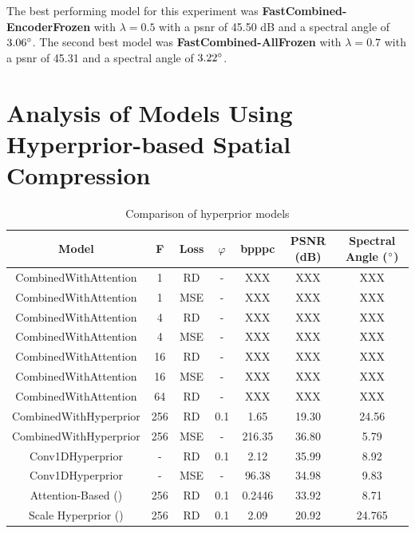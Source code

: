 The best performing model for this experiment was \textbf{FastCombined-EncoderFrozen} with $\lambda=0.5$ with a \ac{psnr} of 45.50 dB and a spectral angle of $3.06 \degree$. The second best model was \textbf{FastCombined-AllFrozen} with $\lambda=0.7$ with a \ac{psnr} of 45.31 and a spectral angle of $3.22 \degree$.

\section{Analysis of Models Using Hyperprior-based Spatial Compression\label{sec:ch5hyperprior}}
\begin{table}
\centering
\begin{tabular}{|c|c|c|c|c|c|c|}
\hline
Model & F & Loss &$\varphi$ & bpppc & PSNR (dB) & Spectral Angle ($\degree$) \\
\hline\hline
CombinedWithAttention & 1 & RD & - & XXX & XXX & XXX \\
\hline
CombinedWithAttention & 1 & MSE & - & XXX & XXX & XXX \\
\hline
CombinedWithAttention & 4 & RD & - & XXX & XXX & XXX \\
\hline
CombinedWithAttention & 4 & MSE & - & XXX & XXX & XXX \\
\hline
CombinedWithAttention & 16 & RD & - & XXX & XXX & XXX \\
\hline
CombinedWithAttention & 16 & MSE & - & XXX & XXX & XXX \\
\hline
CombinedWithAttention & 64 & RD & - & XXX & XXX & XXX \\
\hline
CombinedWithHyperprior & 256 & RD & 0.1 & 1.65 & 19.30 & 24.56 \\
\hline
CombinedWithHyperprior & 256 & MSE & - & 216.35 & 36.80 & 5.79 \\
\hline
Conv1DHyperprior & - & RD & 0.1 & 2.12 & 35.99 & 8.92 \\
\hline
Conv1DHyperprior & - & MSE & - & 96.38 & 34.98 & 9.83 \\
\hline
Attention-Based (\citep{cheng_learned_2020}) & 256 & RD & 0.1 & 0.2446 & 33.92 & 8.71 \\
\hline
Scale Hyperprior (\citep{balle_variational_2018}) & 256 & RD & 0.1 & 2.09 & 20.92 & 24.765 \\
\hline
\end{tabular}
\caption{Comparison of hyperprior models}
\label{fig:hyperpriorcomp}
\end{table}

